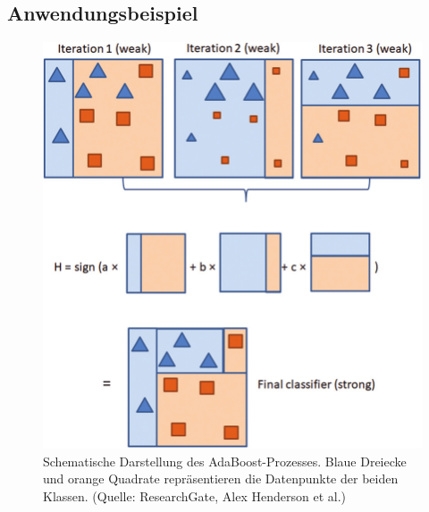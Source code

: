 \subsection{Anwendungsbeispiel}
\begin{figure}[htbp]
    \centering
    \includegraphics[width=\linewidth]{Images/adaBoostSchemaatic.png}
    \caption[Schematische Darstellung des AdaBoost-Prozesses]{Schematische Darstellung des AdaBoost-Prozesses. Blaue Dreiecke und orange Quadrate repräsentieren die Datenpunkte der beiden Klassen. (Quelle: ResearchGate, Alex Henderson et al.)}
    \label{fig:adaboost_schematic}
\end{figure}
  